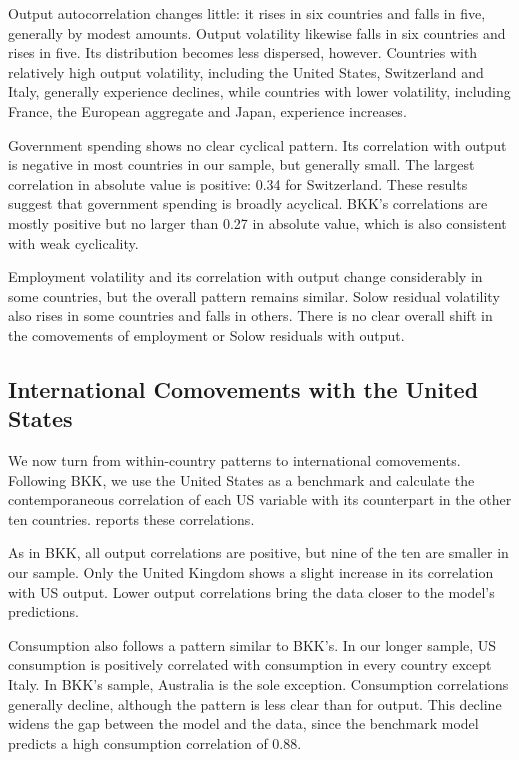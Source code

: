 Output autocorrelation changes little: it rises in six countries and falls in five, generally by modest amounts. Output volatility likewise falls in six countries and rises in five. Its distribution becomes less dispersed, however. Countries with relatively high output volatility, including the United States, Switzerland and Italy, generally experience declines, while countries with lower volatility, including France, the European aggregate and Japan, experience increases.

Government spending shows no clear cyclical pattern. Its correlation with output is negative in most countries in our sample, but generally small. The largest correlation in absolute value is positive: 0.34 for Switzerland. These results suggest that government spending is broadly acyclical. BKK's correlations are mostly positive but no larger than 0.27 in absolute value, which is also consistent with weak cyclicality.

Employment volatility and its correlation with output change considerably in some countries, but the overall pattern remains similar. Solow residual volatility also rises in some countries and falls in others. There is no clear overall shift in the comovements of employment or Solow residuals with output.

\subsection{International Comovements with the United States}
We now turn from within-country patterns to international comovements. Following BKK, we use the United States as a benchmark and calculate the contemporaneous correlation of each US variable with its counterpart in the other ten countries.  reports these correlations.

As in BKK, all output correlations are positive, but nine of the ten are smaller in our sample. Only the United Kingdom shows a slight increase in its correlation with US output. Lower output correlations bring the data closer to the model's predictions.

Consumption also follows a pattern similar to BKK's. In our longer sample, US consumption is positively correlated with consumption in every country except Italy. In BKK's sample, Australia is the sole exception. Consumption correlations generally decline, although the pattern is less clear than for output. This decline widens the gap between the model and the data, since the benchmark model predicts a high consumption correlation of 0.88.

